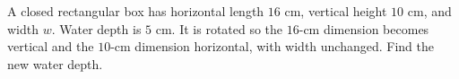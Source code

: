A closed rectangular box has horizontal length $16$ cm, vertical height $10$ cm, and width $w$. Water depth is $5$ cm. It is rotated so the $16$-cm dimension becomes vertical and the $10$-cm dimension horizontal, with width unchanged. Find the new water depth.
